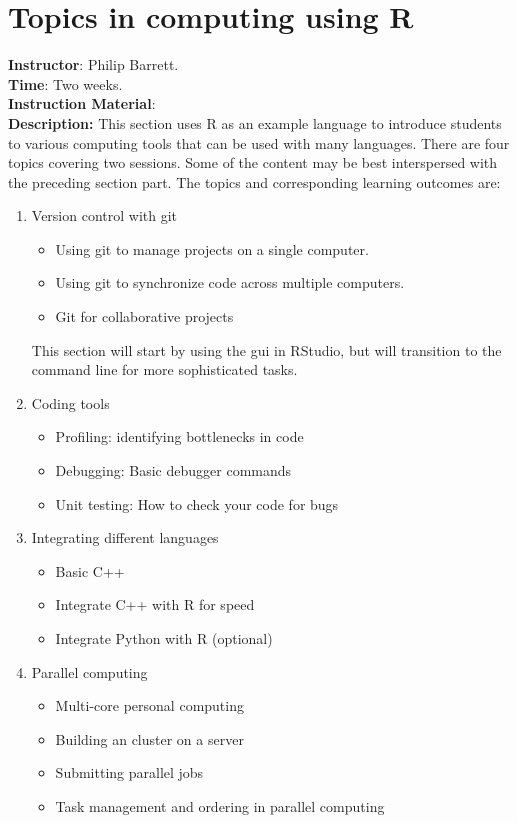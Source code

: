 \section{Topics in computing using R}
\noindent \textbf{Instructor}: Philip Barrett.\\
\noindent \textbf{Time}: Two weeks.\\
\noindent \textbf{Instruction Material}: \\
\noindent \textbf{Description:} This section uses R as an example language to introduce students to various computing tools that can be used with many languages.  There are four topics covering two sessions.  Some of the content may be best interspersed with the preceding section part.  The topics and corresponding learning outcomes are:
\begin{enumerate}
  \item Version control with git
	\begin{itemize}
	  \item Using git to manage projects on a single computer.
	  \item Using git to synchronize code across multiple computers.
	  \item Git for collaborative projects
	\end{itemize}
	This section will start by using the gui in RStudio, but will transition to the command line for more sophisticated tasks.
 
  \item Coding tools
	\begin{itemize}
	  \item Profiling: identifying bottlenecks in code
	  \item Debugging: Basic debugger commands
	  \item Unit testing: How to check your code for bugs
	\end{itemize}
 
  \item Integrating different languages
	\begin{itemize}
	  \item Basic C++
	  \item Integrate C++ with R for speed
	  \item Integrate Python with R (optional)
	\end{itemize}
 
  \item Parallel computing
	\begin{itemize}
	  \item Multi-core personal computing
	  \item	Building an cluster on a server
	  \item Submitting parallel jobs
	  \item Task management and ordering in parallel computing
	\end{itemize}
 
\end{enumerate}



